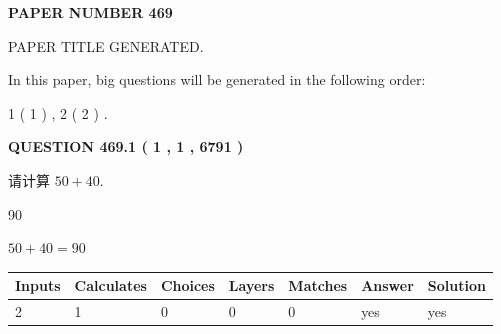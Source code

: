 \documentclass{ctexart}
\begin{document}
   
 {\textbf{ \Large{ PAPER NUMBER  469  }}}
   
   
\vspace{0.2in}
   
   
   
   
   
   
   
   
 \vspace{0.2in}
 
 
 
 
   
   
 PAPER TITLE GENERATED.
   
   
   
\vspace{0.2in}
   
In this paper, big questions will be generated in the following order: 
   
   
   1 ( 1 )
 ,
   2 ( 2 )
 .
  
\vspace{0.2in}
  
{\textbf{\Large{QUESTION
469.1 
 ( 1 , 1 , 6791 )
}}}
  
  
 
请计算 $ %
50 +  %
40 $.
 
 
 
\noindent{}
 
 

90
 
 
\noindent{}
 
 

 
 
 
\noindent{}
 
 

$ %
50 +  %
40=   %
90$
 
 
\noindent{}
 
 

 
   
   
   
   
\noindent\begin{tabular}{|l|l|l|l|l|l|l|}
 \hline
Inputs & Calculates & Choices & Layers & Matches & Answer & Solution \\ \hline
 2  & 
 1  & 
 0
  & 
 0  & 
 0  & 
  yes & 
  yes 
  \\ \hline
 \end{tabular}
   
\end{document}
